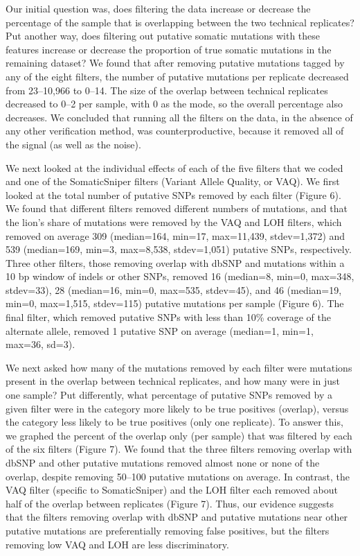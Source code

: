 \documentclass[11pt]{article} %
\begin{document}
Our initial question was, does filtering the data increase or decrease the percentage of the sample that is overlapping between the two technical replicates? Put another way, does filtering out putative somatic mutations with these features increase or decrease the proportion of true somatic mutations in the remaining dataset? We found that after removing putative mutations tagged by any of the eight filters, the number of putative mutations per replicate decreased from 23--10,966 to 0--14. The size of the overlap between technical replicates decreased to 0--2 per sample, with 0 as the mode, so the overall percentage also decreases. We concluded that running all the filters on the data, in the absence of any other verification method, was counterproductive, because it removed all of the signal (as well as the noise). 

We next looked at the individual effects of each of the five filters that we coded and one of the SomaticSniper filters (Variant Allele Quality, or VAQ). We first looked at the total number of putative SNPs removed by each filter (Figure 6). We found that different filters removed different numbers of mutations, and that the lion's share of mutations were removed by the VAQ and LOH filters, which removed on average 309 (median=164, min=17, max=11,439, stdev=1,372) and 539 (median=169, min=3, max=8,538, stdev=1,051) putative SNPs, respectively. Three other filters, those removing overlap with dbSNP and mutations within a 10 bp window of indels or other SNPs, removed 16 (median=8, min=0, max=348, stdev=33), 28 (median=16, min=0, max=535, stdev=45), and 46 (median=19, min=0, max=1,515, stdev=115) putative mutations per sample (Figure 6). The final filter, which removed putative SNPs with less than 10\% coverage of the alternate allele, removed 1 putative SNP on average (median=1, min=1, max=36, sd=3). 

We next asked how many of the mutations removed by each filter were mutations present in the overlap between technical replicates, and how many were in just one sample? Put differently, what percentage of putative SNPs removed by a given filter were in the category more likely to be true positives (overlap), versus the category less likely to be true positives (only one replicate). To answer this, we graphed the percent of the overlap only (per sample) that was filtered by each of the six filters (Figure 7). We found that the three filters removing overlap with dbSNP and other putative mutations removed almost none or none of the overlap, despite removing 50--100 putative mutations on average. In contrast, the VAQ filter (specific to SomaticSniper) and the LOH filter each removed about half of the overlap between replicates (Figure 7). Thus, our evidence suggests that the filters removing overlap with dbSNP and putative mutations near other putative mutations are preferentially removing false positives, but the filters removing low VAQ and LOH are less discriminatory. 
\end{document}
